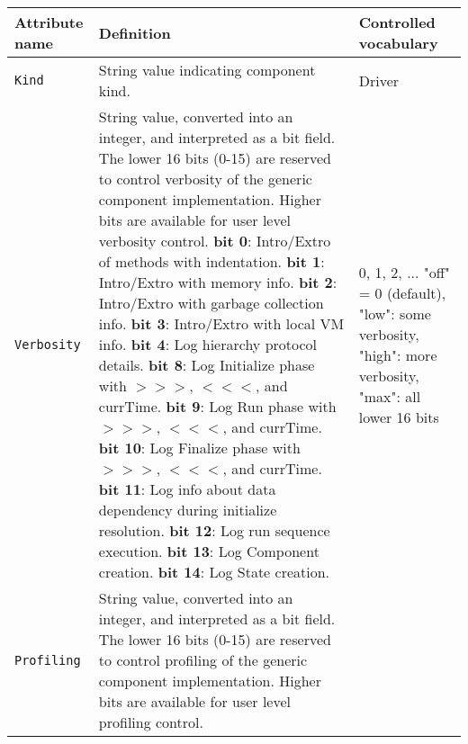 \begin{longtable}{|p{}|p{}|p{}|}
     \hline\hline
     {\bf Attribute name} & {\bf Definition} & {\bf Controlled vocabulary}\\
     \hline\hline
     {\tt Kind} & String value indicating component kind.& Driver\\ \hline
     {\tt Verbosity} & String value, converted into an integer, and interpreted as a bit field. The lower 16 bits (0-15) are reserved to control verbosity of the generic component implementation. Higher bits are available for user level verbosity control. \newline
                       {\bf bit 0}: Intro/Extro of methods with indentation.\newline
                       {\bf bit 1}: Intro/Extro with memory info.\newline
                       {\bf bit 2}: Intro/Extro with garbage collection info.\newline
                       {\bf bit 3}: Intro/Extro with local VM info.\newline
                       {\bf bit 4}: Log hierarchy protocol details.\newline
                       {\bf bit 8}: Log Initialize phase with $>>>$, $<<<$, and currTime.\newline
                       {\bf bit 9}: Log Run phase with $>>>$, $<<<$, and currTime.\newline
                       {\bf bit 10}: Log Finalize phase with $>>>$, $<<<$, and currTime.\newline
                       {\bf bit 11}: Log info about data dependency during initialize resolution.\newline
                       {\bf bit 12}: Log run sequence execution.\newline
                       {\bf bit 13}: Log Component creation.\newline
                       {\bf bit 14}: Log State creation.
                     & 0, 1, 2, ... \newline
                       "off" = 0 (default), \newline
                       "low": some verbosity, \newline
                       "high": more verbosity, \newline
                       "max": all lower 16 bits\\ \hline
     {\tt Profiling} & String value, converted into an integer, and interpreted as a bit field. The lower 16 bits (0-15) are reserved to control profiling of the generic component implementation. Higher bits are available for user level profiling control. \newline

\end{longtable}
